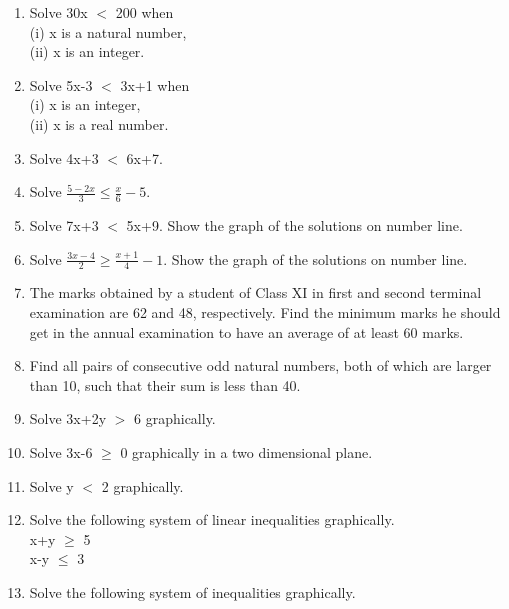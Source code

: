\renewcommand{\theequation}{\theenumi}
\begin{enumerate}[label=\arabic*.,ref=\thesubsection.\theenumi]

    \item Solve 30x $<$ 200 when\\
    (i) x is a natural number,\\
    (ii) x is an integer.\\
    \item Solve 5x-3 $<$ 3x+1 when\\
    (i) x is an integer,\\
    (ii) x is a real number.\\
    \item Solve 4x+3 $<$ 6x+7.\\
    \item Solve $\frac{5-2x}{3} \leq \frac{x}{6}-5$.\\
    \item Solve 7x+3 $<$ 5x+9. Show the graph of the solutions on number line.\\
    \item Solve $\frac{3x-4}{2} \geq \frac{x+1}{4}-1$. Show the graph of the solutions on number line.\\
    \item The marks obtained by a student of Class XI in first and second terminal examination are 62 and 48, respectively. Find the minimum marks he should get in the annual examination to have an average of at least 60 marks.\\
    \item Find all pairs of consecutive odd natural numbers, both of which are larger than 10, such that their sum is less than 40.\\
    \item Solve 3x+2y $>$ 6 graphically.\\
    \item Solve 3x-6 $\geq$ 0 graphically in a two dimensional plane.\\
    \item Solve y $<$ 2 graphically.\\
    \item Solve the following system of linear inequalities graphically.\\
    x+y $\geq$ 5\\
    x-y $\leq$ 3\\
    \item Solve the following system of inequalities graphically.\\

\end{enumerate}
